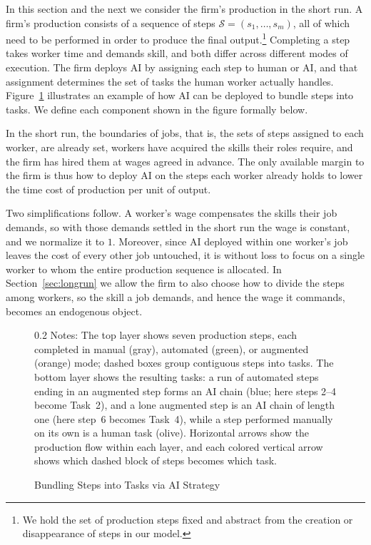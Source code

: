 In this section and the next we consider the firm's production in the short run.
A firm's production consists of a sequence of steps $\mathcal{S}=(s_1,\ldots,s_m)$, all of which need to be performed in order to produce the final output.\footnote{
We hold the set of production steps fixed and abstract from the creation or disappearance of steps in our model.
}
Completing a step takes worker time and demands skill, and both differ across different modes of execution.
The firm deploys AI by assigning each step to human or AI, and that assignment determines the set of tasks the human worker actually handles.
Figure~\ref{fig:steps_tasks} illustrates an example of how AI can be deployed to bundle steps into tasks.
We define each component shown in the figure formally below.

In the short run, the boundaries of jobs, that is, the sets of steps assigned to each worker, are already set, workers have acquired the skills their roles require, and the firm has hired them at wages agreed in advance.
The only available margin to the firm is thus how to deploy AI on the steps each worker already holds to lower the time cost of production per unit of output.

Two simplifications follow.
A worker's wage compensates the skills their job demands, so with those demands settled in the short run the wage is constant, and we normalize it to $1$.
Moreover, since AI deployed within one worker's job leaves the cost of every other job untouched, it is without loss to focus on a single worker to whom the entire production sequence is allocated.
In Section~\ref{sec:longrun} we allow the firm to also choose how to divide the steps among workers, so the skill a job demands, and hence the wage it commands, becomes an endogenous object.

\begin{figure}[!t]
  \centering
  \caption{Bundling Steps into Tasks via AI Strategy}
  \label{fig:steps_tasks}
  
  \par\vspace{\fignotesskip}
\begin{minipage}{1\linewidth}
\begin{spacing}{0.2}
{\fontsize{9.5pt}{10pt}\selectfont Notes: The top layer shows seven production steps, each completed in manual (gray), automated (green), or augmented (orange) mode; dashed boxes group contiguous steps into tasks. The bottom layer shows the resulting tasks: a run of automated steps ending in an augmented step forms an AI chain (blue; here steps 2--4 become Task~2), and a lone augmented step is an AI chain of length one (here step~6 becomes Task~4), while a step performed manually on its own is a human task (olive). Horizontal arrows show the production flow within each layer, and each colored vertical arrow shows which dashed block of steps becomes which task.}
\end{spacing}
\end{minipage}
\end{figure}



